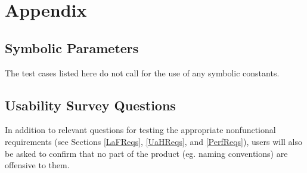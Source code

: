 \documentclass[12pt, titlepage]{article}
\begin{document}
%

%

\newpage

\section{Appendix}

\subsection{Symbolic Parameters}

The test cases listed here do not call for the use of any symbolic constants.

\subsection{Usability Survey Questions}

In addition to relevant questions for testing the appropriate nonfunctional requirements (see Sections \ref{LaFReqs}, \ref{UaHReqs}, and \ref{PerfReqs}), users will also be asked to confirm that no part of the product (eg. naming conventions) are offensive to them.
\end{document}
